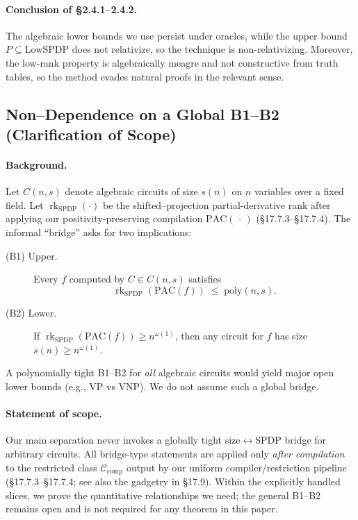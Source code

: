 \documentclass[12pt]{article}
\theoremstyle{definition}
\theoremstyle{definition}
\theoremstyle{remark}
\theoremstyle{remark}
\begin{document}
\paragraph{Conclusion of \S2.4.1--2.4.2.}
The algebraic lower bounds we use persist under oracles, while the upper bound $P \subseteq \mathrm{LowSPDP}$ does not relativize, so the technique is non-relativizing. Moreover, the low-rank property is algebraically meagre and not constructive from truth tables, so the method evades natural proofs in the relevant sense.

\subsection{Non--Dependence on a Global B1--B2 (Clarification of Scope)}
\label{subsec:no-global-b12}

\paragraph{Background.}
Let $C(n,s)$ denote algebraic circuits of size $s(n)$ on $n$ variables over a fixed field. Let $\operatorname{rk}_{\mathrm{SPDP}}(\cdot)$ be the shifted--projection partial-derivative rank after applying our positivity-preserving compilation $\mathrm{PAC}(\,\cdot\,)$ (\S17.7.3--\S17.7.4). The informal ``bridge'' asks for two implications:

\begin{description}
\item[(B1) Upper.] Every $f$ computed by $C \in C(n,s)$ satisfies
\[
\operatorname{rk}_{\mathrm{SPDP}}(\mathrm{PAC}(f)) \;\le\; \mathrm{poly}(n,s).
\]
\item[(B2) Lower.] If $\operatorname{rk}_{\mathrm{SPDP}}(\mathrm{PAC}(f)) \ge n^{\omega(1)}$, then any circuit for $f$ has size $s(n) \ge n^{\omega(1)}$.
\end{description}

A polynomially tight B1--B2 for \emph{all} algebraic circuits would yield major open lower bounds (e.g., VP vs VNP). We do not assume such a global bridge.

\paragraph{Statement of scope.}
Our main separation never invokes a globally tight size$\leftrightarrow$SPDP bridge for arbitrary circuits. All bridge-type statements are applied only \emph{after compilation} to the restricted class $\mathcal{C}_{\mathrm{comp}}$ output by our uniform compiler/restriction pipeline (\S17.7.3--\S17.7.4; see also the gadgetry in \S17.9). Within the explicitly handled slices, we prove the quantitative relationships we need; the general B1--B2 remains open and is not required for any theorem in this paper.
\end{document}

